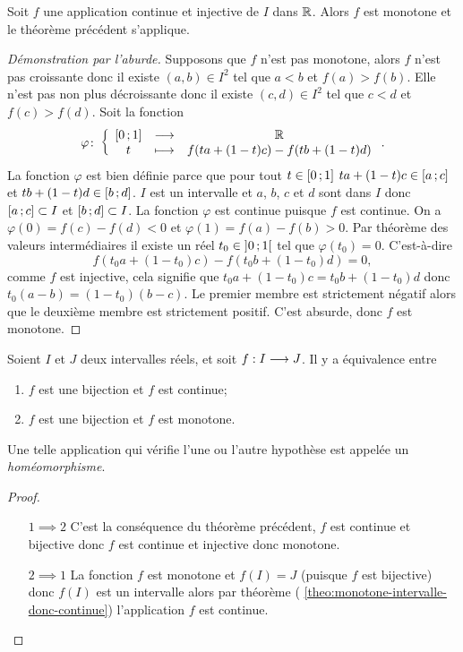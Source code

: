 \begin{theo}
  Soit \(f\) une application continue et injective de \(I\) dans \(\mathbb{R}\). Alors \(f\) est monotone et le théorème précédent s'applique.
\end{theo}
\begin{proof}[Démonstration par l'aburde]
  Supposons que \(f\) n'est pas monotone, alors \(f\) n'est pas croissante donc il existe \((a,b) \in I^2\) tel que \(a < b\) et \(f(a) > f(b)\). Elle n'est pas non plus décroissante donc il existe \((c,d) \in I^2\) tel que \(c < d\) et \(f(c) > f(d)\). Soit la fonction
  \begin{equation}
    \varphi\colon \left\{\begin{array}{ccc} \left[ 0 \, ;  1 \right] & \longrightarrow &\mathbb{R}\\ t & \longmapsto & f(ta+(1-t)c)-f(tb+(1-t)d) \end{array} \right..
  \end{equation}
  La fonction \(\varphi\) est bien définie parce que pour tout \(t \in \left[ 0 \, ;  1 \right]\) \(ta+(1-t)c \in \left[ a \, ;  c \right]\) et \(tb+(1-t)d \in \left[ b \, ;  d \right]\). \(I\) est un intervalle et \(a\), \(b\), \(c\) et \(d\) sont dans \(I\) donc \(\left[ a \, ;  c \right] \subset I\) et \(\left[ b \, ;  d \right] \subset I\). La fonction \(\varphi\) est continue puisque \(f\) est continue. On a \(\varphi(0)=f(c)-f(d) <0\) et \(\varphi(1)=f(a)-f(b) >0\). Par théorème des valeurs intermédiaires il existe un réel \(t_0 \in \left] 0 \, ;  1 \right[\) tel que \(\varphi(t_0)=0\). C'est-à-dire
\begin{equation}
  f(t_0a+(1-t_0)c)-f(t_0b+(1-t_0)d)=0,
\end{equation}
comme \(f\) est injective, cela signifie que \(t_0a+(1-t_0)c=t_0b+(1-t_0)d\) donc \(t_0(a-b)=(1-t_0)(b-c)\). Le premier membre est strictement négatif alors que le deuxième membre est strictement positif. C'est absurde, donc \(f\) est monotone.
\end{proof}
\begin{cor}
  Soient \(I\) et \(J\) deux intervalles réels, et soit \(f:I \longrightarrow J\). Il y a équivalence entre
  \begin{enumerate}
  \item \(f\) est une bijection et \(f\) est continue;
  \item \(f\) est une bijection et \(f\) est monotone.
  \end{enumerate}
  Une telle application qui vérifie l'une ou l'autre hypothèse est appelée un \emph{homéomorphisme}.
\end{cor}
\begin{proof}
  \begin{itemize}
  \item[\(1 \implies 2\)] C'est la conséquence du théorème précédent, \(f\) est continue et bijective donc \(f\) est continue et injective donc monotone.
  \item[\(2 \implies 1\)] La fonction \(f\) est monotone et \(f(I)=J\) (puisque \(f\) est bijective) donc \(f(I)\) est un intervalle alors par théorème (
\ref{theo:monotone-intervalle-donc-continue}) l'application \(f\) est continue.
  \end{itemize}
\end{proof}

